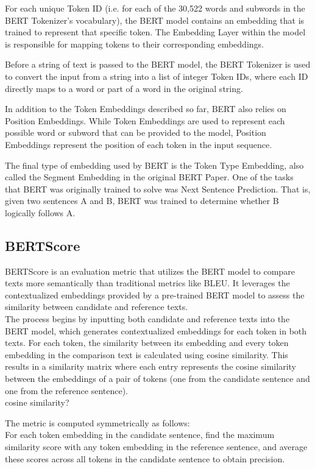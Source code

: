 For each unique Token ID (i.e. for each of the 30,522 words and subwords in the BERT Tokenizer’s vocabulary), the BERT model contains an embedding that is trained to represent that specific token. The Embedding Layer within the model is responsible for mapping tokens to their corresponding embeddings.

Before a string of text is passed to the BERT model, the BERT Tokenizer is used to convert the input from a string into a list of integer Token IDs, where each ID directly maps to a word or part of a word in the original string.

In addition to the Token Embeddings described so far, BERT also relies on Position Embeddings. While Token Embeddings are used to represent each possible word or subword that can be provided to the model, Position Embeddings represent the position of each token in the input sequence.

The final type of embedding used by BERT is the Token Type Embedding, also called the Segment Embedding in the original BERT Paper. One of the tasks that BERT was originally trained to solve was Next Sentence Prediction. That is, given two sentences A and B, BERT was trained to determine whether B logically follows A.


\subsection{BERTScore}
BERTScore is an evaluation metric that utilizes the BERT model to compare texts more semantically than traditional metrics like BLEU. It leverages the contextualized embeddings provided by a pre-trained BERT model to assess the similarity between candidate and reference texts.\\

The process begins by inputting both candidate and reference texts into the BERT model, which generates contextualized embeddings for each token in both texts. For each token, the similarity between its embedding and every token embedding in the comparison text is calculated using cosine similarity. This results in a similarity matrix where each entry represents the cosine similarity between the embeddings of a pair of tokens (one from the candidate sentence and one from the reference sentence).\\
cosine similarity?

The metric is computed symmetrically as follows:\\

For each token embedding in the candidate sentence, find the maximum similarity score with any token embedding in the reference sentence, and average these scores across all tokens in the candidate sentence to obtain precision.\\

